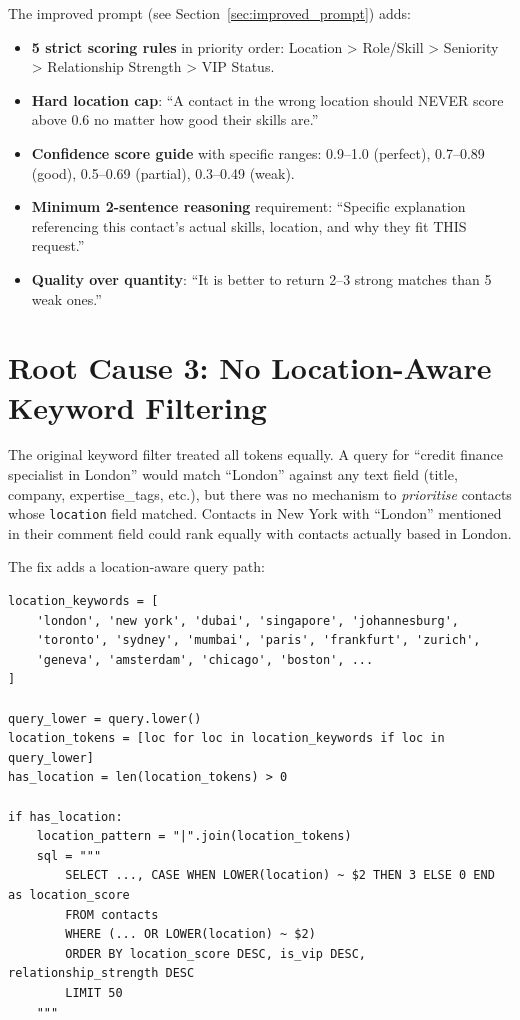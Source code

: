 \documentclass[12pt, a4paper]{report}
\begin{document}
The improved prompt (see Section~\ref{sec:improved_prompt}) adds:

\begin{itemize}[itemsep=3pt]
    \item \textbf{5 strict scoring rules} in priority order: Location > Role/Skill > Seniority > Relationship Strength > VIP Status.
    \item \textbf{Hard location cap}: ``A contact in the wrong location should NEVER score above 0.6 no matter how good their skills are.''
    \item \textbf{Confidence score guide} with specific ranges: 0.9--1.0 (perfect), 0.7--0.89 (good), 0.5--0.69 (partial), 0.3--0.49 (weak).
    \item \textbf{Minimum 2-sentence reasoning} requirement: ``Specific explanation referencing this contact's actual skills, location, and why they fit THIS request.''
    \item \textbf{Quality over quantity}: ``It is better to return 2--3 strong matches than 5 weak ones.''
\end{itemize}

\section{Root Cause 3: No Location-Aware Keyword Filtering}

The original keyword filter treated all tokens equally. A query for ``credit finance specialist in London'' would match ``London'' against any text field (title, company, expertise\_tags, etc.), but there was no mechanism to \textit{prioritise} contacts whose \texttt{location} field matched. Contacts in New York with ``London'' mentioned in their comment field could rank equally with contacts actually based in London.

The fix adds a location-aware query path:

\begin{lstlisting}[style=pythonstyle, caption={Location-aware keyword filter (excerpt)}]
location_keywords = [
    'london', 'new york', 'dubai', 'singapore', 'johannesburg',
    'toronto', 'sydney', 'mumbai', 'paris', 'frankfurt', 'zurich',
    'geneva', 'amsterdam', 'chicago', 'boston', ...
]

query_lower = query.lower()
location_tokens = [loc for loc in location_keywords if loc in query_lower]
has_location = len(location_tokens) > 0

if has_location:
    location_pattern = "|".join(location_tokens)
    sql = """
        SELECT ..., CASE WHEN LOWER(location) ~ $2 THEN 3 ELSE 0 END as location_score
        FROM contacts
        WHERE (... OR LOWER(location) ~ $2)
        ORDER BY location_score DESC, is_vip DESC, relationship_strength DESC
        LIMIT 50
    """
\end{lstlisting}
\end{document}
